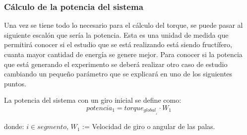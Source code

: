  
 \subsubsection{Cálculo de la potencia del sistema}
 
 Una vez se tiene todo lo necesario para el cálculo del torque, se puede pasar al siguiente escalón que sería la potencia. Esta es una unidad de medida que permitirá conocer si el estudio que se está realizando está siendo fructífero, cuanta mayor cantidad de energía se genere mejor. Para conocer si la potencia que está generando el experimento se deberá realizar otro caso de estudio cambiando un pequeño parámetro que se explicará en uno de los siguientes puntos.
 
  \begin{definicion}
 La potencia del sistema con un giro inicial se define como:
 $$ potencia_1 = torque_{global}__1 \cdot W_1 $$ 
 
 
 donde:
  \centering $i \in segmento$, $W_1$ := Velocidad de giro o angular de las palas.
 \label{def:fuerza_viento}
 \end{definicion}
 
 